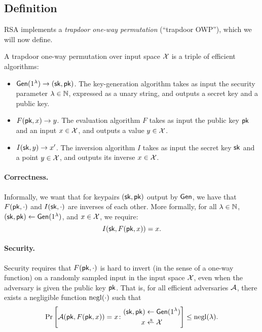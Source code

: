 \subsection{Definition}
RSA implements a \emph{trapdoor one-way permutation} (``trapdoor OWP''), which we will now define.

A trapdoor one-way permutation over input space $\mathcal{X}$ is a triple of
efficient algorithms:

\begin{itemize}
  \item $\mathsf{Gen}(1^\lambda) \to ({\mathsf{sk}}, \mathsf{pk})$.
        The key-generation algorithm takes as input the security parameter $\lambda \in \mathbb{N}$,
        expressed as a unary string, and outputs a secret key and a public key.
  \item $F(\mathsf{pk}, x) \to y$.
        The evaluation algorithm $F$ takes as input the
        public key $\mathsf{pk}$ and an input $x \in \mathcal{X}$, and outputs 
        a value $y \in \mathcal{X}$.
  \item $I({\mathsf{sk}}, y) \to x'$.
        The inversion algorithm $I$ takes as input the secret key ${\mathsf{sk}}$
        and a point $y \in \mathcal{X}$, and outputs its inverse $x \in \mathcal{X}$.
\end{itemize}

\paragraph{Correctness.}
Informally, we want that for keypairs $({\mathsf{sk}}, \mathsf{pk})$ output by $\mathsf{Gen}$,
we have that $F(\mathsf{pk}, \cdot)$ and $I({\mathsf{sk}}, \cdot)$ are inverses of each other.
More formally, for all $\lambda \in \mathbb{N}$, $({\mathsf{sk}}, \mathsf{pk}) \gets \mathsf{Gen}(1^\lambda)$, and $x \in \mathcal{X}$,
we require:
\[ I({\mathsf{sk}}, F(\mathsf{pk}, x))= x.\]

\paragraph{Security.}
Security requires that $F(\mathsf{pk}, \cdot)$ is hard to invert (in the sense of a one-way function)
on a randomly sampled input in the input space $\mathcal{X}$, even when the adversary 
is given the public key $\mathsf{pk}$.
That is, for all efficient adversaries $\mathcal{A}$, there exists a negligible function $\operatorname{negl}(\cdot)$
such that 
\[ \Pr\left[ 
\calA(\pk, F(\pk, x)) = x
\colon \begin{aligned}
  (\sk, \pk) &\gets \Gen(1^\lambda)\\
  x &\getsr \calX
\end{aligned}\right] \leq \negl(\lambda).\]



